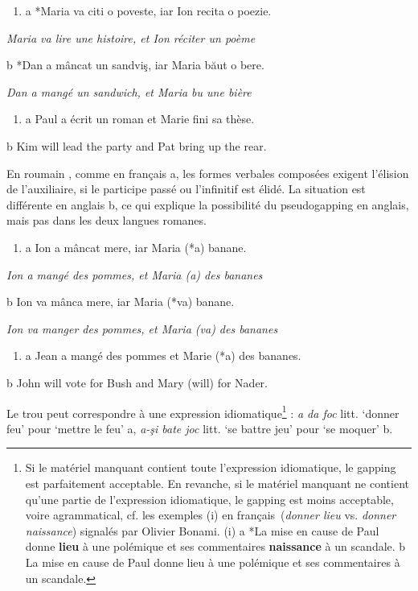 \begin{enumerate}
\item \label{bkm:Ref289278270}a  *Maria va citi o poveste, iar Ion recita o poezie.


\end{enumerate}
{\itshape
Maria va lire une histoire, et Ion réciter un poème } 

  b  *Dan a mâncat un sandviş, iar Maria băut o bere.

{\itshape
Dan a mangé un sandwich, et Maria bu une bière } 


\begin{enumerate}
\item \label{bkm:Ref289278283}a   Paul a écrit un roman et Marie fini sa thèse.          


\end{enumerate}
b  Kim will lead the party and Pat bring up the rear.         

En roumain , comme en français a, les formes verbales composées exigent l'élision de l'auxiliaire, si le participe passé ou l'infinitif est élidé. La situation est différente en anglais b, ce qui explique la possibilité du pseudogapping en anglais, mais pas dans les deux langues romanes.


\begin{enumerate}
\item \label{bkm:Ref289279540}a  Ion a mâncat mere, iar Maria (*a) banane.


\end{enumerate}
{\itshape
Ion a mangé des pommes, et Maria (a) des bananes } 

  b  Ion va mânca mere, iar Maria (*va) banane.

    \textit{Ion va manger des pommes, et Maria (va) des bananes}


\begin{enumerate}
\item \label{bkm:Ref289279575}a   Jean a mangé des pommes et Marie (*a) des bananes.          


\end{enumerate}
  b  John will vote for Bush and Mary (will) for Nader.

Le trou peut correspondre à une expression idiomatique\footnote{Si le matériel manquant contient toute l'expression idiomatique, le gapping est parfaitement acceptable. En revanche, si le matériel manquant ne contient qu'une partie de l'expression idiomatique, le gapping est moins acceptable, voire agrammatical, cf. les exemples (i) en français~(\textit{donner lieu} vs. \textit{donner naissance}) signalés par Olivier Bonami.
(i)  a  *La mise en cause de Paul donne \textbf{lieu} à une polémique et ses commentaires \textbf{naissance} à un scandale.
  b   La mise en cause de Paul donne lieu à une polémique et ses commentaires à un scandale.} : \textit{a da foc} litt. `donner feu' pour `mettre le feu' a, \textit{a-şi bate joc} litt. `se battre jeu' pour `se moquer' b.


